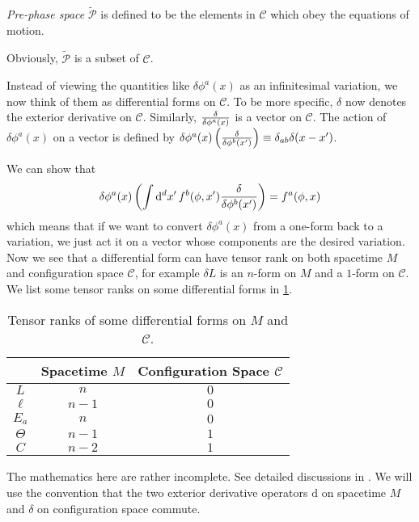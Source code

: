 \documentclass[10pt]{article}
\begin{document}
\begin{definition}
    \textit{Pre-phase space} $\widetilde{\mathcal{P}}$ is defined to be the elements in $\mathcal{C}$ which obey the equations of motion.
\end{definition}
Obviously, $\widetilde{\mathcal{P}}$ is a subset of $\mathcal{C}$.

\begin{intu}
    Instead of viewing the quantities like $\delta\phi^a(x)$ as an infinitesimal variation, we now think of them as differential forms on $\mathcal{C}$.
    To be more specific, $\delta$ now denotes the exterior derivative on $\mathcal{C}$.
    Similarly, $\fdv{\phi^a(x)}$ is a vector on $\mathcal{C}$.
    The action of $\delta\phi^a(x)$ on a vector is defined by $\delta\phi^a(x)\left(\fdv{\phi^b(x')}\right)\equiv\delta_{ab}\delta(x-x')$.
\end{intu}
We can show that
\begin{equation}
    \delta\phi^a(x)\left(\int\dd[d]{x'}f^b(\phi,x')\fdv{\phi^b(x')}\right)=f^a(\phi,x)
\end{equation}
which means that if we want to convert $\delta\phi^a(x)$ from a one-form back to a variation, we just act it on a vector whose components are the desired variation.
Now we see that a differential form can have tensor rank on both spacetime $M$ and configuration space $\mathcal{C}$, for example $\delta L$ is an $n$-form on $M$ and a $1$-form on $\mathcal{C}$.
We list some tensor ranks on some differential forms in \cref{tab:rank}.
\begin{table}[h]
    \centering
    \begin{tabular}{@{}ccc@{}}
        \toprule
                 & Spacetime $M$ & Configuration Space $\mathcal{C}$ \\ \midrule
        $L$      & $n$           & $0$                               \\
        $\ell$   & $n-1$         & $0$                               \\
        $E_a$   & $n$         & $0$                               \\
        $\Theta$ & $n-1$         & $1$                               \\
        $C$      & $n-2$         & $1$                               \\ \bottomrule
    \end{tabular}
    \caption{Tensor ranks of some differential forms on $M$ and $\mathcal{C}$.}
    \label{tab:rank}
\end{table}
\begin{remark}
    The mathematics here are rather incomplete. 
    See detailed discussions in \cite{Crnkovic:1986ex,compere2019advanced}.
    We will use the convention that the two exterior derivative operators $\mathrm{d}$ on spacetime $M$ and $\delta$ on configuration space commute.
\end{remark}
\end{document}
